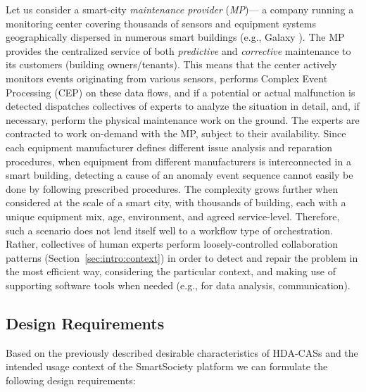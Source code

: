       Let us consider a smart-city \emph{maintenance provider} (\emph{MP})--- a company running a monitoring center covering thousands of sensors and equipment systems geographically dispersed in numerous smart buildings (e.g., Galaxy \cite{Galaxy}). The MP provides the centralized service of both \emph{predictive} and \emph{corrective} maintenance to its customers (building owners/tenants). This means that the center actively monitors events originating from various sensors, performs Complex Event Processing (CEP) on these data flows, and if a potential or actual malfunction is detected dispatches collectives of experts to analyze the situation in detail, and, if necessary, perform the physical maintenance work on the ground. The experts are contracted to work on-demand with the MP, subject to their availability.
      Since each equipment manufacturer defines different issue analysis and reparation procedures, when equipment from different manufacturers is interconnected in a smart building, detecting a cause of an anomaly event sequence cannot easily be done by following prescribed procedures. 
      The complexity grows further when considered at the scale of a smart city, with thousands of building, each with a unique equipment mix, age, environment, and agreed service-level. Therefore, such a scenario does not lend itself well to a workflow type of orchestration. Rather, collectives of human experts perform loosely-controlled collaboration patterns (Section~\ref{sec:intro:context}) in order to detect and repair the problem in the most efficient way, considering the particular context, and making use of supporting software tools when needed (e.g., for data analysis, communication). 

    \subsection{Design Requirements}
    \label{sec:intro:reqs}

      Based on the previously described desirable characteristics of HDA-CASs and the intended usage context of the SmartSociety platform
      we can formulate the following \mdl{} design requirements:
      
